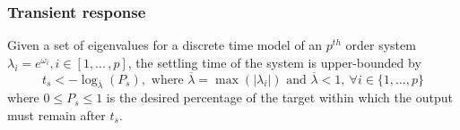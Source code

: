 \documentclass[a4paper,UKenglish]{lipics-v2018}
\begin{document}
\subsubsection{Transient response} 
\label{sec:transientspecificationproof}
\begin{theorem}
Given a set of eigenvalues for a discrete time model of an $p^{th}$ order system $\lambda_i =e^{\omega_i}, i \in [1, ...\,,p]$, the settling time of the system is upper-bounded by
\begin{equation}
t_s<-\log_{\overline{\lambda}}({P_s}), \text{ where }  \overline{\lambda} = \max(|\lambda_i|) \text{ and } \overline{\lambda}<1,\ \forall i \in \{1, \ldots,p\}
\label{eq:set_time}
\end{equation}
where $0\leq P_s \leq 1$ is the desired percentage of the target within which the output must remain after $t_s$.
\end{theorem}
\end{document}
